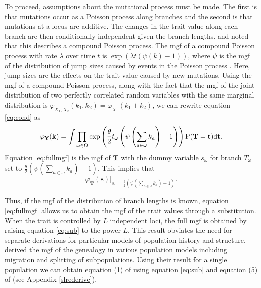 To proceed, assumptions about the mutational process must be made. The first is
that mutations occur as a Poisson process along branches and the second is that
mutations at a locus are additive. The changes in the trait value along each
branch are then conditionally independent given the branch
lengths. \citet{Khaitovich2005} and \citet{Schraiber2015} noted that this
describes a compound Poisson process. The mgf of a compound Poisson process with
rate $\lambda$ over time $t$ is $\exp(\lambda t (\psi(k)-1))$, where $\psi$ is
the mgf of the distribution of jump sizes caused by events in the Poisson
process \citep{kingman-poisson-processes}. Here, jump sizes are the effects on
the trait value caused by new mutations. Using the mgf of a compound Poisson
process, along with the fact that the mgf of the joint distribution of two
perfectly correlated random variables with the same marginal distribution is
$\varphi_{X_1,X_2}(k_1,k_2)=\varphi_{X_1}(k_1+k_2)$, we can rewrite
equation \eqref{eq:cond} as
\begin{equation}
  \label{eq:fullmgf}
  \varphi_{\mathbf{Y}}(\mathbf{k}) = 
  \int \prod_{\omega \in \Omega} \exp\left( \frac{\theta}{2} t_{\omega} \left( \psi\left(\sum_{a \in \omega}k_{a}\right) -1 \right)\right)
  \mathrm{P}(\mathbf{T}=\mathbf{t})\mbox{d}\mathbf{t}.
\end{equation}
Equation \eqref{eq:fullmgf} is the mgf of $\mathbf{T}$ with the dummy variable
$s_{\omega}$ for branch $T_\omega$ set to
$\frac{\theta}{2} \left( \psi(\sum_{a \in \omega}k_{a}) -1 \right)$. This
implies that
\begin{equation}
  \label{eq:sub}
  \varphi_{\mathbf{T}}(\mathbf{s})\Bigr|_{s_{\omega}=\frac{\theta}{2} \left( \psi\left(\sum_{a \in \omega}k_{a}\right) -1 \right)}.
\end{equation}

Thus, if the mgf of the distribution of branch lengths is known, equation
\eqref{eq:fullmgf} allows us to obtain the mgf of the trait values through a
substitution. When the trait is controlled by $L$ independent loci, the full mgf
is obtained by raising equation \eqref{eq:sub} to the power $L$. This result
obviates the need for separate derivations for particular models of population
history and structure.
\citet{Lohse2011} derived the mgf of the genealogy in various population models
including migration and splitting of subpopulations. Using their result for a
single population we can obtain equation (1) of \citet{Schraiber2015} using
equation \eqref{eq:sub} and equation (5) of \citet{Lohse2011}
(see Appendix \ref{slrederive}). 

